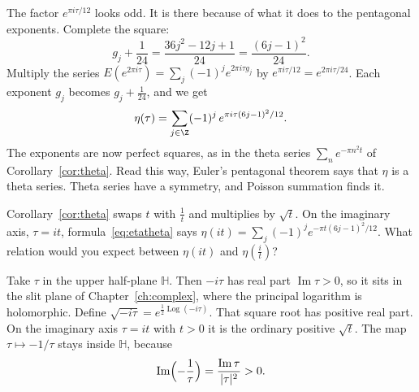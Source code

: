 The factor $e^{\pi i\tau/12}$ looks odd. It is there because of what it does to the pentagonal exponents. Complete the square:
\[
g_j+\frac1{24}=\frac{36j^2-12j+1}{24}=\frac{(6j-1)^2}{24}.
\]
Multiply the series $E(e^{2\pi i\tau})=\sum_j(-1)^je^{2\pi i\tau g_j}$ by $e^{\pi i\tau/12}=e^{2\pi i\tau/24}$. Each exponent $g_j$ becomes $g_j+\frac1{24}$, and we get
\begin{equation}\label{eq:etatheta}
\eta(\tau)=\sum_{j\in\Z}(-1)^j\,e^{\pi i\tau(6j-1)^2/12}.
\end{equation}
The exponents are now perfect squares, as in the theta series $\sum_ne^{-\pi n^2t}$ of Corollary~\ref{cor:theta}. Read this way, Euler's pentagonal theorem says that $\eta$ is a theta series. Theta series have a symmetry, and Poisson summation finds it.

\begin{think}
Corollary~\ref{cor:theta} swaps $t$ with $\frac1t$ and multiplies by $\sqrt t$. On the imaginary axis, $\tau=it$, formula~\eqref{eq:etatheta} says $\eta(it)=\sum_j(-1)^je^{-\pi t(6j-1)^2/12}$. What relation would you expect between $\eta(it)$ and $\eta(\frac it)$?
\end{think}

Take $\tau$ in the upper half-plane $\mathbb H$. Then $-i\tau$ has real part $\operatorname{Im}\tau>0$, so it sits in the slit plane of Chapter~\ref{ch:complex}, where the principal logarithm is holomorphic. Define $\sqrt{-i\tau}=e^{\frac12\operatorname{Log}(-i\tau)}$. That square root has positive real part. On the imaginary axis $\tau=it$ with $t>0$ it is the ordinary positive $\sqrt t$. The map $\tau\mapsto-1/\tau$ stays inside $\mathbb H$, because
\[
\operatorname{Im}\Bigl(-\frac1\tau\Bigr)=\frac{\operatorname{Im}\tau}{|\tau|^2}>0.
\]

